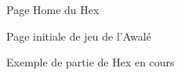 \begin{figure}[!htb]
    \centering
    \caption{Page Home du Hex}\label{fig:exemple_home}
\end{figure}
\begin{figure}[!htb]
    \centering
    \caption{Page initiale de jeu de l'Awalé}\label{fig:awale_board}
\end{figure}
\begin{figure}[!htb]
    \centering
    \caption{Exemple de partie de Hex en cours}\label{fig:hex_board}
\end{figure}

